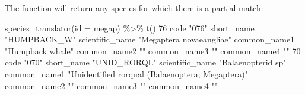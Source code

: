 \documentclass[
]{book}
\newenvironment{Shaded}{\begin{snugshade}}{\end{snugshade}}
\newcommand{\AttributeTok}[1]{\textcolor[rgb]{0.77,0.63,0.00}{#1}}
\newcommand{\DecValTok}[1]{\textcolor[rgb]{0.00,0.00,0.81}{#1}}
\newcommand{\FunctionTok}[1]{\textcolor[rgb]{0.00,0.00,0.00}{#1}}
\newcommand{\NormalTok}[1]{#1}
\newcommand{\SpecialCharTok}[1]{\textcolor[rgb]{0.00,0.00,0.00}{#1}}
\newcommand{\StringTok}[1]{\textcolor[rgb]{0.31,0.60,0.02}{#1}}
\begin{document}
The function will return any species for which there is a partial match:

\begin{Shaded}
\begin{Highlighting}[]
\FunctionTok{species\_translator}\NormalTok{(}\AttributeTok{id =} \StringTok{\textquotesingle{}megap\textquotesingle{}}\NormalTok{) }\SpecialCharTok{\%\textgreater{}\%} \FunctionTok{t}\NormalTok{()}
                \DecValTok{76}                      
\NormalTok{code            }\StringTok{"076"}                   
\NormalTok{short\_name      }\StringTok{"HUMPBACK\_W"}            
\NormalTok{scientific\_name }\StringTok{"Megaptera novaeangliae"}
\NormalTok{common\_name1    }\StringTok{"Humpback whale"}        
\NormalTok{common\_name2    }\StringTok{""}                      
\NormalTok{common\_name3    }\StringTok{""}                      
\NormalTok{common\_name4    }\StringTok{""}                      
                \DecValTok{70}                                              
\NormalTok{code            }\StringTok{"070"}                                           
\NormalTok{short\_name      }\StringTok{"UNID\_RORQL"}                                    
\NormalTok{scientific\_name }\StringTok{"Balaenopterid sp"}                              
\NormalTok{common\_name1    }\StringTok{"Unidentified rorqual (Balaenoptera; Megaptera)"}
\NormalTok{common\_name2    }\StringTok{""}                                              
\NormalTok{common\_name3    }\StringTok{""}                                              
\NormalTok{common\_name4    }\StringTok{""}                                              
\end{Highlighting}
\end{Shaded}
\end{document}
